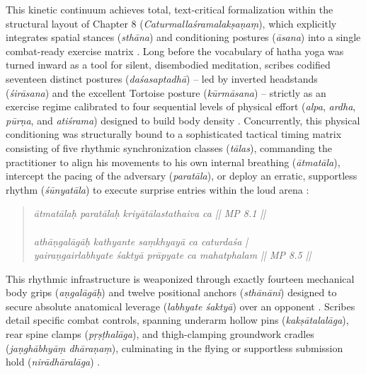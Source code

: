 \documentclass[11pt,twoside,letterpaper]{article}
\begin{document}
This kinetic continuum achieves total, text-critical formalization within the structural layout of Chapter 8 (\textit{Caturmalla\'sramalak\d{s}a\d{n}a\d{m}}), which explicitly integrates spatial stances (\textit{sth\={a}na}) and conditioning postures (\textit{\={a}sana}) into a single combat-ready exercise matrix \citep{MP_7_v44}. Long before the vocabulary of hatha yoga was turned inward as a tool for silent, disembodied meditation, scribes codified seventeen distinct postures (\textit{da\'sasaptadh\={a}}) -- led by inverted headstands (\textit{\'sir\={a}sana}) and the excellent Tortoise posture (\textit{k\={u}rm\={a}sana}) -- strictly as an exercise regime calibrated to four sequential levels of physical effort (\textit{alpa}, \textit{ardha}, \textit{p\={u}r\d{n}a}, and \textit{ati\'srama}) designed to build body density \citep{MP_7_v45}. Concurrently, this physical conditioning was structurally bound to a sophisticated tactical timing matrix consisting of five rhythmic synchronization classes (\textit{t\={a}las}), commanding the practitioner to align his movements to his own internal breathing (\textit{\={a}tmat\={a}la}), intercept the pacing of the adversary (\textit{parat\={a}la}), or deploy an erratic, supportless rhythm (\textit{\'s\={u}nyat\={a}la}) to execute surprise entries within the loud arena \citep{MP_7_v46}:

\begin{quote}
\small
\textit{\={a}tmat\={a}la\d{h} parat\={a}la\d{h} kriy\={a}t\={a}lastathaiva ca || MP 8.1 || \\
\\
ath\={a}\d{n}gal\={a}g\={a}\d{h} kathyante sa\d{m}khyay\={a} ca caturda\'sa | \\
yaira\d{n}gairlabhyate \'sakty\={a} pr\={a}pyate ca mahatphalam || MP 8.5 ||}
\end{quote}

This rhythmic infrastructure is weaponized through exactly fourteen mechanical body grips (\textit{a\d{n}gal\={a}g\={a}\d{h}}) and twelve positional anchors (\textit{sth\={a}n\={a}ni}) designed to secure absolute anatomical leverage (\textit{labhyate \'sakty\={a}}) over an opponent \citep{MP_7_v47}. Scribes detail specific combat controls, spanning underarm hollow pins (\textit{kak\d{s}\={a}talal\={a}ga}), rear spine clamps (\textit{p\d{r}\d{s}\d{t}hal\={a}ga}), and thigh-clamping groundwork cradles (\textit{ja\d{n}gh\={a}bhy\={a}\d{m} dh\={a}ra\d{n}a\d{m}}), culminating in the flying or supportless submission hold (\textit{nir\={a}dh\={a}ral\={a}ga}) \citep{MP_7_v48}. 
\end{document}

